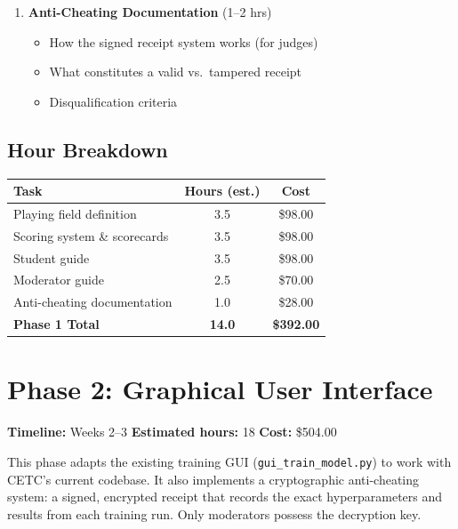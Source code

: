 \documentclass[a4paper]{article}
\begin{document}
\begin{enumerate}[leftmargin=*]
    \item \textbf{Anti-Cheating Documentation} (1--2 hrs)
    \begin{itemize}
        \item How the signed receipt system works (for judges)
        \item What constitutes a valid vs.\ tampered receipt
        \item Disqualification criteria
    \end{itemize}
\end{enumerate}

\subsection*{Hour Breakdown}

\begin{center}
\begin{tabular}{lcc}
\toprule
\textbf{Task} & \textbf{Hours (est.)} & \textbf{Cost} \\
\midrule
Playing field definition & 3.5 & \$98.00 \\
Scoring system \& scorecards & 3.5 & \$98.00 \\
Student guide & 3.5 & \$98.00 \\
Moderator guide & 2.5 & \$70.00 \\
Anti-cheating documentation & 1.0 & \$28.00 \\
\midrule
\textbf{Phase 1 Total} & \textbf{14.0} & \textbf{\$392.00} \\
\bottomrule
\end{tabular}
\end{center}

\section*{Phase 2: Graphical User Interface}

\noindent\textbf{Timeline:} Weeks 2--3 \hfill \textbf{Estimated hours:} 18 \hfill \textbf{Cost:} \$504.00

\vspace{0.5em}

This phase adapts the existing training GUI (\texttt{gui\_train\_model.py}) to work with CETC's current codebase. It also implements a cryptographic anti-cheating system: a signed, encrypted receipt that records the exact hyperparameters and results from each training run. Only moderators possess the decryption key.
\end{document}
